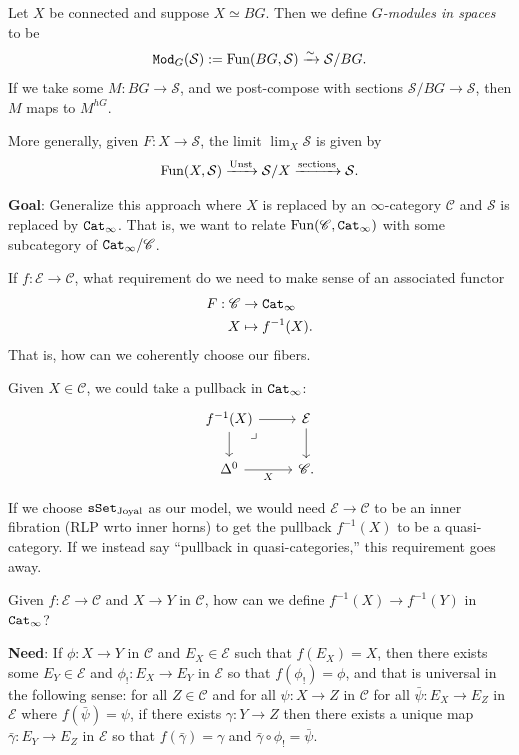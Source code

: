 \documentclass[12pt]{amsart}
\theoremstyle{definition}
\providecommand{\Unst}{\text{Unst}}
\begin{document}
Let $X$ be connected and suppose $X \simeq BG$. Then we define $G$\textit{-modules in spaces} to be
\begin{align*}
    \texttt{Mod}_G(\mathcal{S}) := \text{Fun}(BG,\mathcal{S}) \xrightarrow{\sim} \mathcal{S}/BG.
\end{align*}
If we take some $M: BG \to \mathcal{S}$, and we post-compose with sections $\mathcal{S}/BG \to \mathcal{S}$, then $M$ maps to $M^{hG}$.

More generally, given $F: X \to \mathcal{S}$, the limit $\lim_X \mathcal{S}$ is given by
\begin{align*}
    \Fun(X,\mathcal{S}) \xto{\Unst} \mathcal{S}/X \xto{\text{sections}} \mathcal{S}.
\end{align*}

\textbf{Goal}: Generalize this approach where $X$ is replaced by an $\infty$-category $\mathscr{C}$ and $\mathcal{S}$ is replaced by $\texttt{Cat}_\infty$. That is, we want to relate $\text{Fun}(\mathscr{C},\texttt{Cat}_\infty)$ with some subcategory of $\texttt{Cat}_\infty/\mathscr{C}$.

If $f: \mathcal{E} \to \mathscr{C}$, what requirement do we need to make sense of an associated functor
\begin{align*}
    F: \mathscr{C} &\to \texttt{Cat}_\infty \\
    X &\mapsto f^{-1}(X).
\end{align*}
That is, how can we coherently choose our fibers.

Given $X \in \mathscr{C}$, we could take a pullback in $\texttt{Cat}_\infty$:
\[ \begin{tikzcd}
    f^{-1}(X)\rar\dar\pb & \mathcal{E}\dar\\
    \Delta^0\rar["X" below] & \mathscr{C}.
\end{tikzcd} \]

If we choose $\texttt{sSet}_{\text{Joyal}}$ as our model, we would need $\mathcal{E} \to \mathscr{C}$ to be an inner fibration (RLP wrto inner horns) to get the pullback $f^{-1}(X)$ to be a quasi-category. If we instead say ``pullback in quasi-categories,'' this requirement goes away.

Given $f: \mathcal{E} \to \mathscr{C}$ and $X \to Y$ in $\mathscr{C}$, how can we define $f^{-1}(X) \to f^{-1}(Y)$ in $\texttt{Cat}_\infty$?

\textbf{Need}: If $\phi: X \to Y$ in $\mathscr{C}$ and $E_X \in \mathcal{E}$ such that $f(E_X) = X$, then there exists some $E_Y\in \mathcal{E}$ and $\phi_!: E_X \to E_Y$ in $\mathcal{E}$ so that $f(\phi_!) = \phi$, and that is universal in the following sense: for all $Z\in \mathscr{C}$ and for all $\psi: X \to Z$ in $\mathscr{C}$ for all $\bar{\psi}: E_X \to E_Z$ in $\mathcal{E}$ where $f(\bar{\psi}) = \psi$, if there exists $\gamma: Y \to Z$ then there exists a unique map $\bar{\gamma}: E_Y \to E_Z$ in $\mathcal{E}$ so that $f(\bar{\gamma}) = \gamma$ and $\bar{\gamma} \circ \phi_! = \bar{\psi}$.
\end{document}
